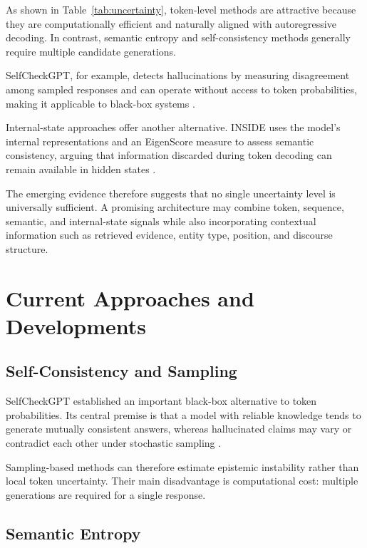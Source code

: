 \documentclass[11pt]{article}
\begin{document}
As shown in Table~\ref{tab:uncertainty}, token-level methods are attractive because they are computationally efficient and naturally aligned with autoregressive decoding. In contrast, semantic entropy and self-consistency methods generally require multiple candidate generations.

SelfCheckGPT, for example, detects hallucinations by measuring disagreement among sampled responses and can operate without access to token probabilities, making it applicable to black-box systems \cite{manakul2023}.

Internal-state approaches offer another alternative. INSIDE uses the model's internal representations and an EigenScore measure to assess semantic consistency, arguing that information discarded during token decoding can remain available in hidden states \cite{chen2024}.

The emerging evidence therefore suggests that no single uncertainty level is universally sufficient. A promising architecture may combine token, sequence, semantic, and internal-state signals while also incorporating contextual information such as retrieved evidence, entity type, position, and discourse structure.

\section{Current Approaches and Developments}
\label{sec:current}

\subsection{Self-Consistency and Sampling}
\label{sec:self-consistency}

SelfCheckGPT established an important black-box alternative to token probabilities. Its central premise is that a model with reliable knowledge tends to generate mutually consistent answers, whereas hallucinated claims may vary or contradict each other under stochastic sampling \cite{manakul2023}.

Sampling-based methods can therefore estimate epistemic instability rather than local token uncertainty. Their main disadvantage is computational cost: multiple generations are required for a single response.

\subsection{Semantic Entropy}
\label{sec:semantic-entropy-current}
\end{document}
